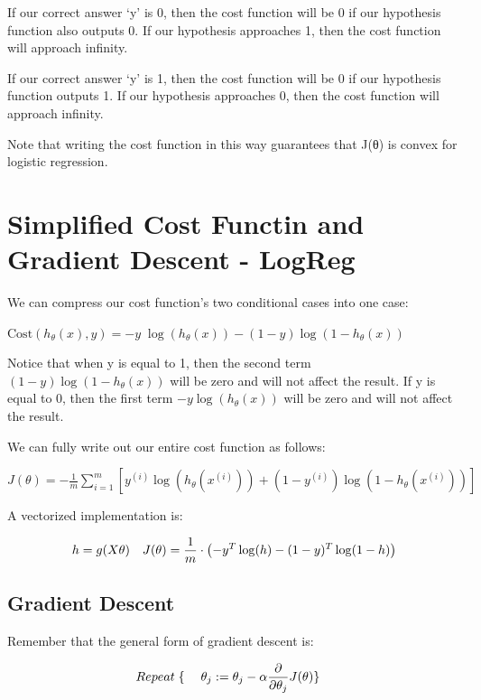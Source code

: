 \documentclass[
]{book}
\begin{document}
If our correct answer `y' is 0, then the cost function will be 0 if our hypothesis function also outputs 0. If our hypothesis approaches 1, then the cost function will approach infinity.

If our correct answer `y' is 1, then the cost function will be 0 if our hypothesis function outputs 1. If our hypothesis approaches 0, then the cost function will approach infinity.

Note that writing the cost function in this way guarantees that J(θ) is convex for logistic regression.

\hypertarget{simplified-cost-functin-and-gradient-descent---logreg}{%
\section{Simplified Cost Functin and Gradient Descent - LogReg}\label{simplified-cost-functin-and-gradient-descent---logreg}}

We can compress our cost function's two conditional cases into one case:

\(\mathrm{Cost}(h_\theta(x),y) = - y \; \log(h_\theta(x)) - (1 - y) \log(1 - h_\theta(x))\)

Notice that when y is equal to 1, then the second term \((1-y)\log(1-h_\theta(x))\) will be zero and will not affect the result. If y is equal to 0, then the first term \(-y \log(h_\theta(x))\) will be zero and will not affect the result.

We can fully write out our entire cost function as follows:

\(J(\theta) = - \frac{1}{m} \displaystyle \sum_{i=1}^m [y^{(i)}\log (h_\theta (x^{(i)})) + (1 - y^{(i)})\log (1 - h_\theta(x^{(i)}))]\)

A vectorized implementation is:

{
\begin{align} & h = g(X\theta)\newline & J(\theta) = \frac{1}{m} \cdot \left(-y^{T}\log(h)-(1-y)^{T}\log(1-h)\right) \end{align}
}

\hypertarget{gradient-descent}{%
\subsection{Gradient Descent}\label{gradient-descent}}

Remember that the general form of gradient descent is:

\begin{align}& Repeat \; \lbrace \newline & \; \theta_j := \theta_j - \alpha \dfrac{\partial}{\partial \theta_j}J(\theta) \newline & \rbrace\end{align}
\end{document}
